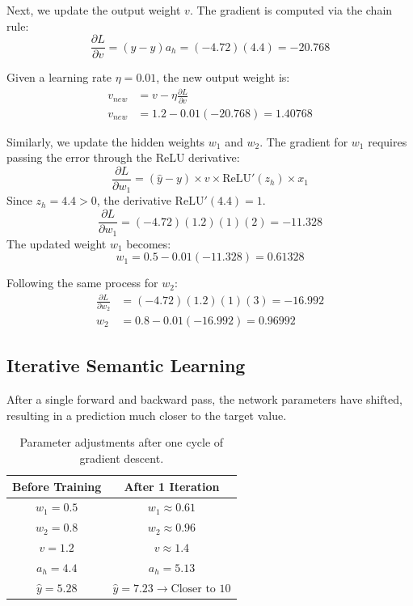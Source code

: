 \documentclass[10pt, conference]{IEEEtran}
\begin{document}
Next, we update the output weight $v$. The gradient is computed via the chain rule:
\begin{equation}
    \frac{\partial L}{\partial v} = (\hat{y} - y) a_h = (-4.72)(4.4) = -20.768
\end{equation}

Given a learning rate $\eta = 0.01$, the new output weight is:
\begin{align}
    v_{new} &= v - \eta \frac{\partial L}{\partial v} \\
    v_{new} &= 1.2 - 0.01(-20.768) = 1.40768
\end{align}

Similarly, we update the hidden weights $w_1$ and $w_2$. The gradient for $w_1$ requires passing the error through the ReLU derivative:
\begin{equation}
    \frac{\partial L}{\partial w_1} = (\hat{y} - y) \times v \times \text{ReLU}'(z_h) \times x_1
\end{equation}
Since $z_h = 4.4 > 0$, the derivative $\text{ReLU}'(4.4) = 1$.
\begin{equation}
    \frac{\partial L}{\partial w_1} = (-4.72)(1.2)(1)(2) = -11.328
\end{equation}
The updated weight $w_1$ becomes:
\begin{equation}
    w_1 = 0.5 - 0.01(-11.328) = 0.61328
\end{equation}

Following the same process for $w_2$:
\begin{align}
    \frac{\partial L}{\partial w_2} &= (-4.72)(1.2)(1)(3) = -16.992 \\
    w_2 &= 0.8 - 0.01(-16.992) = 0.96992
\end{align}

\subsection{\textbf{Iterative Semantic Learning}}
After a single forward and backward pass, the network parameters have shifted, resulting in a prediction much closer to the target value.

\begin{table}[h]
\centering
\begin{tabular}{|c|c|}
\hline
\textbf{Before Training} & \textbf{After 1 Iteration} \\ \hline
$w_1 = 0.5$ & $w_1 \approx 0.61$ \\
$w_2 = 0.8$ & $w_2 \approx 0.96$ \\
$v = 1.2$ & $v \approx 1.4$ \\
$a_h = 4.4$ & $a_h = 5.13$ \\
$\hat{y} = 5.28$ & $\hat{y} = 7.23 \rightarrow \text{Closer to 10}$ \\ \hline
\end{tabular}
\caption{Parameter adjustments after one cycle of gradient descent.}
\label{tab:weight_update}
\end{table}
\end{document}
